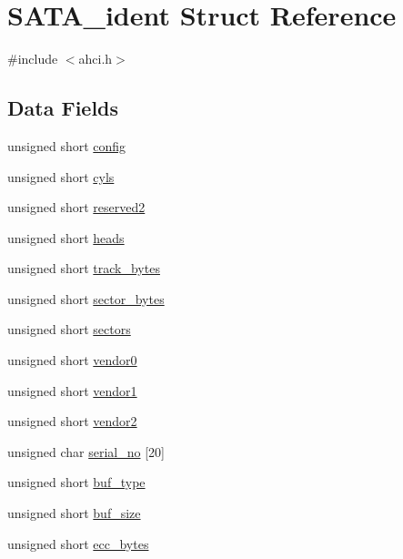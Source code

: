 \hypertarget{structSATA__ident}{}\section{S\+A\+T\+A\+\_\+ident Struct Reference}
\label{structSATA__ident}


{\ttfamily \#include $<$ahci.\+h$>$}

\subsection*{Data Fields}
\begin{DoxyCompactItemize}
\item 
unsigned short \hyperlink{structSATA__ident_a3e2eb6859b4845ab26956b03933e8774}{config}
\item 
unsigned short \hyperlink{structSATA__ident_a4ecef9e7e7c21adcd2cdbbb6947074f7}{cyls}
\item 
unsigned short \hyperlink{structSATA__ident_a8be69794eccacf473f7c55523dfdd885}{reserved2}
\item 
unsigned short \hyperlink{structSATA__ident_a3e5cda071ccaf6040395b709b17af752}{heads}
\item 
unsigned short \hyperlink{structSATA__ident_afc42e0fec367087ac600bf1eee537efb}{track\+\_\+bytes}
\item 
unsigned short \hyperlink{structSATA__ident_a586fe0828c423dac3306683c0b275a35}{sector\+\_\+bytes}
\item 
unsigned short \hyperlink{structSATA__ident_ad3a035c565a78ea9fafaf696ab2e29b8}{sectors}
\item 
unsigned short \hyperlink{structSATA__ident_a59ae424a72fd8d4ccb2eec8b94f97dd1}{vendor0}
\item 
unsigned short \hyperlink{structSATA__ident_a57a0bd1026214ec3cad61717fea08ee9}{vendor1}
\item 
unsigned short \hyperlink{structSATA__ident_a7c5a4057f43da3eff3935c977d634a0d}{vendor2}
\item 
unsigned char \hyperlink{structSATA__ident_ab3928623c2c1f05d7dd0635aef68adf7}{serial\+\_\+no} \mbox{[}20\mbox{]}
\item 
unsigned short \hyperlink{structSATA__ident_a697bedabe956a0d4022ef9c2aca00c97}{buf\+\_\+type}
\item 
unsigned short \hyperlink{structSATA__ident_a775f5fa54b6bcb76cc9f93a38bd09c99}{buf\+\_\+size}
\item 
unsigned short \hyperlink{structSATA__ident_a09bad065c4b053be42711ffd161fbed7}{ecc\+\_\+bytes}

\end{DoxyCompactItemize}
